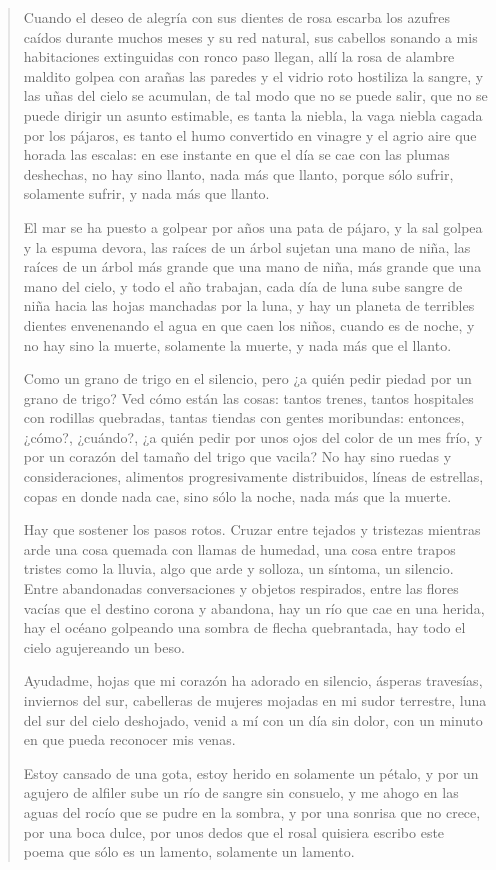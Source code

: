 \documentclass[12pt]{article}
\begin{document}
\clearpage
{}
\begin{verse}
Cuando el deseo de alegría con sus dientes de rosa  
escarba los azufres caídos durante muchos meses  
y su red natural, sus cabellos sonando  
a mis habitaciones extinguidas con ronco paso llegan,  
allí la rosa de alambre maldito  
golpea con arañas las paredes  
y el vidrio roto hostiliza la sangre,  
y las uñas del cielo se acumulan,  
de tal modo que no se puede salir, que no se puede dirigir  
un asunto estimable,  
es tanta la niebla, la vaga niebla cagada por los pájaros,  
es tanto el humo convertido en vinagre  
y el agrio aire que horada las escalas:  
en ese instante en que el día se cae con las plumas deshechas,  
no hay sino llanto, nada más que llanto,  
porque sólo sufrir, solamente sufrir,  
y nada más que llanto.  
	
El mar se ha puesto a golpear por años una pata de pájaro,  
y la sal golpea y la espuma devora,  
las raíces de un árbol sujetan una mano de niña,  
las raíces de un árbol más grande que una mano de niña,  
más grande que una mano del cielo,  
y todo el año trabajan, cada día de luna  
sube sangre de niña hacia las hojas manchadas por la luna,  
y hay un planeta de terribles dientes  
envenenando el agua en que caen los niños,  
cuando es de noche, y no hay sino la muerte,  
solamente la muerte, y nada más que el llanto.  
	
Como un grano de trigo en el silencio, pero  
¿a quién pedir piedad por un grano de trigo?  
Ved cómo están las cosas: tantos trenes,  
tantos hospitales con rodillas quebradas,  
tantas tiendas con gentes moribundas:  
entonces, ¿cómo?, ¿cuándo?,  
¿a quién pedir por unos ojos del color de un mes frío,  
y por un corazón del tamaño del trigo que vacila?  
No hay sino ruedas y consideraciones,  
alimentos progresivamente distribuidos,  
líneas de estrellas, copas  
en donde nada cae, sino sólo la noche,  
nada más que la muerte.  
	
Hay que sostener los pasos rotos.  
Cruzar entre tejados y tristezas mientras arde  
una cosa quemada con llamas de humedad,  
una cosa entre trapos tristes como la lluvia,  
algo que arde y solloza,  
un síntoma, un silencio.  
Entre abandonadas conversaciones y objetos respirados,  
entre las flores vacías que el destino corona y abandona,  
hay un río que cae en una herida,  
hay el océano golpeando una sombra de flecha quebrantada,  
hay todo el cielo agujereando un beso.  
	
Ayudadme, hojas que mi corazón ha adorado en silencio,  
ásperas travesías, inviernos del sur, cabelleras  
de mujeres mojadas en mi sudor terrestre,  
luna del sur del cielo deshojado,  
venid a mí con un día sin dolor,  
con un minuto en que pueda reconocer mis venas.  
	
Estoy cansado de una gota,  
estoy herido en solamente un pétalo,  
y por un agujero de alfiler sube un río de sangre sin consuelo,  
y me ahogo en las aguas del rocío que se pudre en la sombra,  
y por una sonrisa que no crece, por una boca dulce,  
por unos dedos que el rosal quisiera  
escribo este poema que sólo es un lamento,  
solamente un lamento.  

\end{verse}
\end{document}
